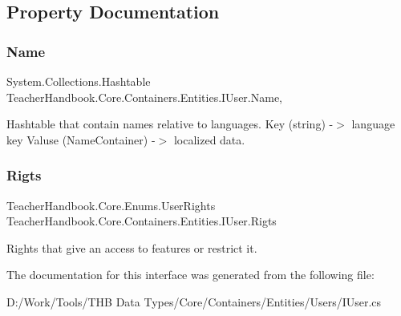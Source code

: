 \subsection{Property Documentation}
\mbox{\label{interface_teacher_handbook_1_1_core_1_1_containers_1_1_entities_1_1_i_user_a528fbfbe0effa7e8683cb892b08c4c64}} 
\subsubsection{\texorpdfstring{Name}{Name}}
{\footnotesize\ttfamily System.\+Collections.\+Hashtable Teacher\+Handbook.\+Core.\+Containers.\+Entities.\+I\+User.\+Name\hspace{0.3cm}{\ttfamily [get]}, {\ttfamily [set]}}



Hashtable that contain names relative to languages. Key (string) -\/$>$ language key Valuse (Name\+Container) -\/$>$ localized data. 

\mbox{\label{interface_teacher_handbook_1_1_core_1_1_containers_1_1_entities_1_1_i_user_a147a0793a5587c93da634d0c997e13ec}} 
\subsubsection{\texorpdfstring{Rigts}{Rigts}}
{\footnotesize\ttfamily Teacher\+Handbook.\+Core.\+Enums.\+User\+Rights Teacher\+Handbook.\+Core.\+Containers.\+Entities.\+I\+User.\+Rigts\hspace{0.3cm}{\ttfamily [get]}}



Rights that give an access to features or restrict it. 



The documentation for this interface was generated from the following file\+:\begin{DoxyCompactItemize}
\item 
D\+:/\+Work/\+Tools/\+T\+H\+B Data Types/\+Core/\+Containers/\+Entities/\+Users/I\+User.\+cs\end{DoxyCompactItemize}
